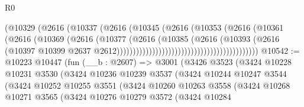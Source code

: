 \begin{lexlean}{R0}
\begin{coremodule}
                                                      (@10329
                                                        (@2616
                                                          (@10337
                                                            (@2616
                                                              (@10345
                                                                (@2616
                                                                  (@10353
                                                                    (@2616
                                                                      (@10361
                                                                        (@2616
                                                                          (@10369
                                                                            (@2616
                                                                              (@10377
                                                                                (@2616
                                                                                  (@10385
                                                                                    (@2616
                                                                                      (@10393
                                                                                        (@2616
                                                                                          (@10397
                                                                                            @10399
                                                                                            @2637
                                                                                            @2612))))))))))))))))))))))))))))))))))))))))))))
@10542 := @10223
    @10447
    (fun (__b : @2607) =>
    @3001
      (@3426
        @3523
        (@3424
          @10228
          @10231
          @3530
          (@3424
            @10236
            @10239
            @3537
            (@3424
              @10244
              @10247
              @3544
              (@3424
                @10252
                @10255
                @3551
                (@3424
                  @10260
                  @10263
                  @3558
                  (@3424
                    @10268
                    @10271
                    @3565
                    (@3424
                      @10276
                      @10279
                      @3572
                      (@3424
                        @10284

\end{coremodule}
\end{lexlean}
